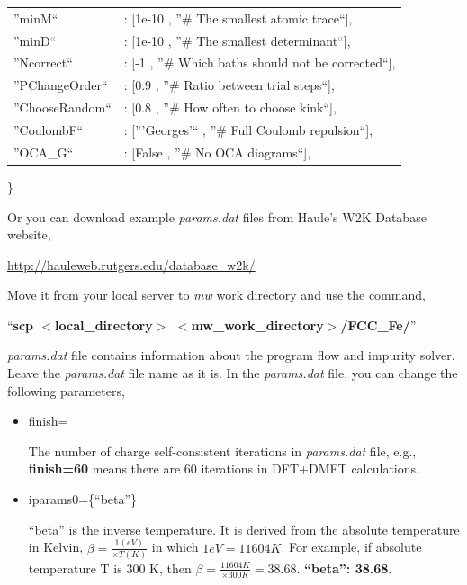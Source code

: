 \documentclass[12 pt]{article}
\begin{document}
\begin{itemize}
{\begin{tabular}{ll}
	    ''minM``	& : [1e-10		, ''\# The smallest atomic trace``],\\

	    ''minD``	& : [1e-10		, ''\# The smallest determinant``],\\

	    ''Ncorrect``	& : [-1		, ''\# Which baths should not be corrected``],\\

	    ''PChangeOrder``	& : [0.9		, ''\# Ratio between trial steps``],\\

	    ''ChooseRandom``	& : [0.8		, ''\# How often to choose kink``],\\

	    ''CoulombF``	& : ['''Georges'``		, ''\# Full Coulomb repulsion``],\\

	    ''OCA\_G``	& : [False		, ''\# No OCA diagrams``],\\
	    
  \end{tabular}

  \}

}

  \cleardoublepage

  Or you can download example \emph{params.dat} files from Haule's W2K Database website, 

  \url{http://hauleweb.rutgers.edu/database_w2k/}

  Move it from your local server to \emph{mw} work directory and use the command,

  ``\textbf{scp $<$local\_directory$>$ $<$mw\_work\_directory$>$/FCC\_Fe/}''

  \emph{params.dat} file contains information about the program flow and impurity solver. Leave the \emph{params.dat} 
file name as it is. In the \emph{params.dat} file, you can change the following parameters,

	      \begin{itemize}

	      \item finish=

  The number of charge self-consistent iterations in \emph{params.dat} file, e.g., \textbf{finish=60} means there are
 60 iterations in DFT+DMFT calculations. 

	      \item iparams0=\{``beta''\}

  ``beta'' is the inverse temperature. It is derived from the absolute temperature in Kelvin, $\beta=\frac{1(eV)}
{×T(K)}$ in which $1eV=11604K$. For example, if absolute temperature T is 300 K, then $\beta=\frac{11604K}{×300K}=
38.68$. \textbf{``beta'': 38.68}.


\end{itemize}
\end{itemize}
\end{document}
